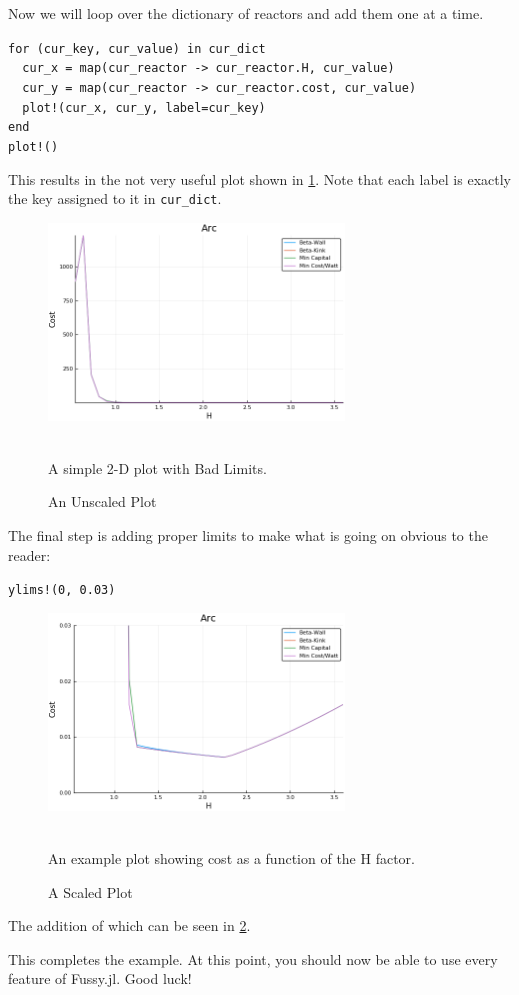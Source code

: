 Now we will loop over the dictionary of reactors and add them one at a time.

\begin{addmargin}[1.5em]{1.5em}
\texttt{for (cur\_key, cur\_value) in cur\_dict \\
\-\ \-\ cur\_x = map(cur\_reactor -> cur\_reactor.H, cur\_value) \\
\-\ \-\ cur\_y = map(cur\_reactor -> cur\_reactor.cost, cur\_value) \\
\-\ \-\ plot!(cur\_x, cur\_y, label=cur\_key) \\
end \\
plot!()
}
\end{addmargin}

This results in the not very useful plot shown in \cref{fig:example_3}. Note that each label is exactly the key assigned to it in \texttt{cur\_dict}.

\begin{figure}
	\centering
	\includegraphics[width=0.7\textwidth]{images/example_3}
	\caption{An Unscaled Plot} ~\\
	\small A simple 2-D plot with Bad Limits. 
	\label{fig:example_3}
\end{figure}

The final step is adding proper limits to make what is going on obvious to the reader:

\begin{addmargin}[1.5em]{1.5em}
\texttt{ylims!(0, 0.03)}
\end{addmargin}

\begin{figure}
	\centering
	\includegraphics[width=0.7\textwidth]{images/example_4}
	\caption{A Scaled Plot} ~\\
	\small An example plot showing cost as a function of the H factor. 
	\label{fig:example_4}
\end{figure}

The addition of which can be seen in \cref{fig:example_4}.

This completes the example. At this point, you should now be able to use every feature of Fussy.jl. Good luck!
